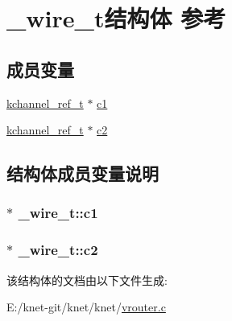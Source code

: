 \hypertarget{a00051}{}\section{\+\_\+wire\+\_\+t结构体 参考}
\label{a00051}
\subsection*{成员变量}
\begin{DoxyCompactItemize}
\item 
\hyperlink{a00066_a3b7e82599367eade261456f60ebe2cd9_a3b7e82599367eade261456f60ebe2cd9}{kchannel\+\_\+ref\+\_\+t} $\ast$ \hyperlink{a00051_a7da02688b9b074c535d87309d6fea3df_a7da02688b9b074c535d87309d6fea3df}{c1}
\item 
\hyperlink{a00066_a3b7e82599367eade261456f60ebe2cd9_a3b7e82599367eade261456f60ebe2cd9}{kchannel\+\_\+ref\+\_\+t} $\ast$ \hyperlink{a00051_a4c7d438d47a605eb56fc5576c13ae97f_a4c7d438d47a605eb56fc5576c13ae97f}{c2}
\end{DoxyCompactItemize}


\subsection{结构体成员变量说明}
\hypertarget{a00051_a7da02688b9b074c535d87309d6fea3df_a7da02688b9b074c535d87309d6fea3df}{}
\subsubsection[{c1}]{$\ast$ \+\_\+wire\+\_\+t\+::c1}\label{a00051_a7da02688b9b074c535d87309d6fea3df_a7da02688b9b074c535d87309d6fea3df}
\hypertarget{a00051_a4c7d438d47a605eb56fc5576c13ae97f_a4c7d438d47a605eb56fc5576c13ae97f}{}
\subsubsection[{c2}]{$\ast$ \+\_\+wire\+\_\+t\+::c2}\label{a00051_a4c7d438d47a605eb56fc5576c13ae97f_a4c7d438d47a605eb56fc5576c13ae97f}


该结构体的文档由以下文件生成\+:\begin{DoxyCompactItemize}
\item 
E\+:/knet-\/git/knet/knet/\hyperlink{a00125}{vrouter.\+c}\end{DoxyCompactItemize}

